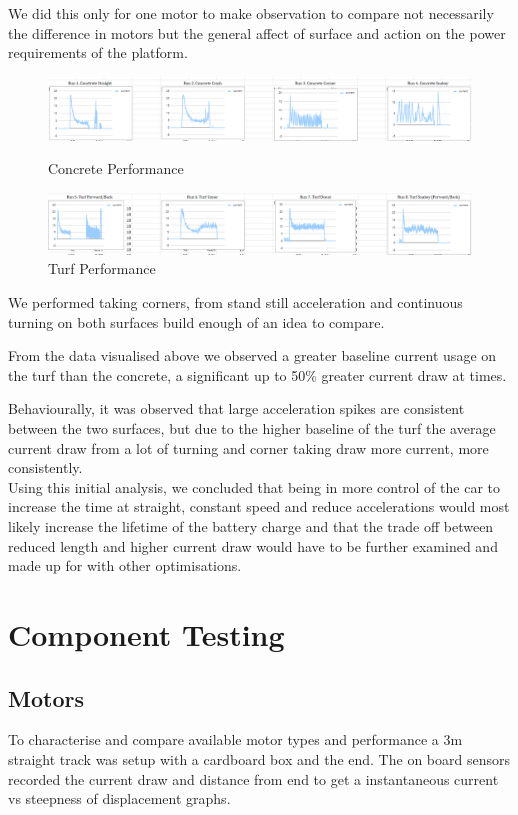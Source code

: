 \documentclass[11pt]{article}
\begin{document}
We did this only for one motor to make observation to compare not necessarily the difference in motors but the general affect of surface and action on the power requirements of the platform.

\begin{figure}[h!]
    \begin{center}
        \includegraphics[width=\textwidth]{inc/contrete_behaviour.png}
        \caption{Concrete Performance}
        \includegraphics[width=\textwidth]{inc/turf_behaviour.png}
        \caption{Turf Performance}
    \end{center}
\end{figure}

We performed taking corners, from stand still acceleration and continuous turning on both surfaces build enough of an idea to compare.

From the data visualised above we observed a greater baseline current usage on the turf than the concrete, a significant up to 50\% greater current draw at times.

Behaviourally, it was observed that large acceleration spikes are consistent between the two surfaces, but due to the higher baseline of the turf the average current draw from a lot of turning and corner taking draw more current, more consistently.\\

Using this initial analysis, we concluded that being in more control of the car to increase the time at straight, constant speed and reduce accelerations would most likely increase the lifetime of the battery charge and that the trade off between reduced length and higher current draw would have to be further examined and made up for with other optimisations.



\section{Component Testing}
\subsection{Motors}
To characterise and compare available motor types and performance a 3m straight track was setup with a cardboard box and the end. The on board sensors recorded the current draw and distance from end to get a instantaneous current vs steepness of displacement graphs.
\end{document}

